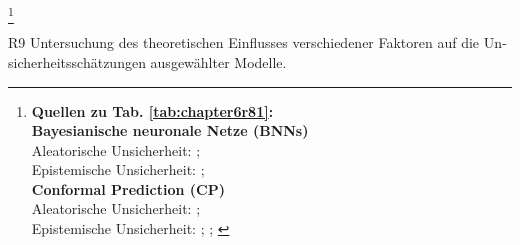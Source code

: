\begin{otherlanguage}{ngerman}
\footnote{%
\begin{minipage}[t]{\textwidth}
\scriptsize
\textbf{Quellen zu Tab. \ref{tab:chapter6r81}:}\\[0.5em]
\textbf{Bayesianische neuronale Netze (BNNs)}\\
Aleatorische Unsicherheit: \parencite[Kap.~3]{blundell2015weight}; \parencite[S.~40–42]{gal2016uncertainty} \\
Epistemische Unsicherheit: \parencite[S.~40–42]{gal2016uncertainty}; \parencite{mackay1992practical} \\[0.5em]

\textbf{Conformal Prediction (CP)}\\
Aleatorische Unsicherheit: \parencite[S.~4–5]{vovk2005algorithmic}; \parencite{angelopoulos2021gentle} \\
Epistemische Unsicherheit: \parencite{angelopoulos2021gentle}; \parencite[S.~63–65]{shafer2008tutorial}; \parencite{rasmussen2006gaussian}
\end{minipage}%
}


\pagebreak


R9 Untersuchung des theoretischen Einflusses verschiedener Faktoren auf die Unsicherheitsschätzungen ausgewählter Modelle.






\end{otherlanguage}

